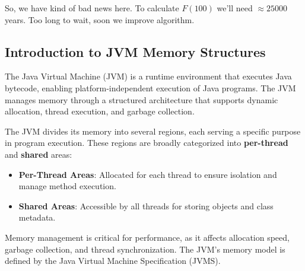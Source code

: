 \documentclass{article}
\begin{document}
So, we have kind of bad news here. To calculate $F(100)$ we'll need $\approx 25 000$ years. Too long to wait, soon we improve algorithm.

\subsection{Introduction to JVM Memory Structures}

The Java Virtual Machine (JVM) is a runtime environment that executes Java bytecode, enabling platform-independent execution of Java programs. The JVM manages memory through a structured architecture that supports dynamic allocation, thread execution, and garbage collection.


The JVM divides its memory into several regions, each serving a specific purpose in program execution. These regions are broadly categorized into \textbf{per-thread} and \textbf{shared} areas:
\begin{itemize}
	\item \textbf{Per-Thread Areas}: Allocated for each thread to ensure isolation and manage method execution.
	\item \textbf{Shared Areas}: Accessible by all threads for storing objects and class metadata.
\end{itemize}
Memory management is critical for performance, as it affects allocation speed, garbage collection, and thread synchronization. The JVM's memory model is defined by the Java Virtual Machine Specification (JVMS).
\end{document}

